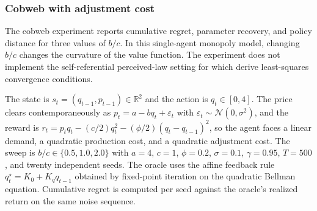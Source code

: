 \subsubsection{Cobweb with adjustment cost}
\label{section:fc_dual_sim_cobweb}

The cobweb experiment reports cumulative regret, parameter recovery, and policy distance for three values of $b/c$. In this single-agent monopoly model, changing $b/c$ changes the curvature of the value function. The experiment does not implement the self-referential perceived-law setting for which \citet{MarcetSargent1989} derive least-squares convergence conditions.

The state is $s_t = (q_{t-1}, p_{t-1}) \in \mathbb{R}^2$ and the action is $q_t \in [0, 4]$.
The price clears contemporaneously as $p_t = a - b q_t + \varepsilon_t$ with $\varepsilon_t \sim \mathcal{N}(0, \sigma^2)$, and the reward is $r_t = p_t q_t - (c/2) q_t^2 - (\phi/2)(q_t - q_{t-1})^2$, so the agent faces a linear demand, a quadratic production cost, and a quadratic adjustment cost.
The sweep is $b/c \in \{0.5, 1.0, 2.0\}$ with $a = 4$, $c = 1$, $\phi = 0.2$, $\sigma = 0.1$, $\gamma = 0.95$, $T = 500$, and twenty independent seeds.
The oracle uses the affine feedback rule $q_t^\star = K_0 + K_q q_{t-1}$ obtained by fixed-point iteration on the quadratic Bellman equation. Cumulative regret is computed per seed against the oracle's realized return on the same noise sequence.


